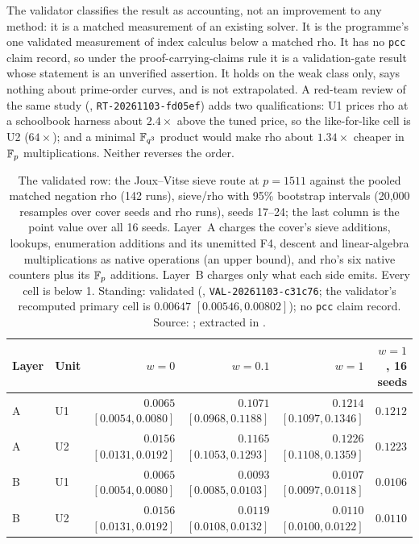 The validator classifies the result as accounting, not an improvement to
any method: it is a matched measurement of an existing solver. It is the
programme's one validated measurement of index calculus below a matched rho.
It has no \texttt{pcc} claim record, so under the proof-carrying-claims rule
it is a validation-gate result whose statement is an unverified assertion.
It holds on the weak class only, says nothing about prime-order curves, and
is not extrapolated. A red-team review of the same study
(,
\texttt{RT-20261103-fd05ef}) adds two qualifications: U1 prices rho at a
schoolbook harness about $2.4\times$ above the tuned price, so the
like-for-like cell is U2 ($64\times$); and a minimal $\mathbb{F}_{q^3}$ product would
make rho about $1.34\times$ cheaper in $\mathbb{F}_p$ multiplications. Neither
reverses the order.

\begin{table}[t]
\centering\small
\setlength{\tabcolsep}{4pt}
\begin{tabular}{@{}llrrrr@{}}
\toprule
Layer & Unit & $w=0$ & $w=0.1$ & $w=1$ & $w=1$, 16 seeds \\
\midrule
A & U1 & $0.0065$ $[0.0054,0.0080]$ & $0.1071$ $[0.0968,0.1188]$ & $0.1214$ $[0.1097,0.1346]$ & $0.1212$ \\
A & U2 & $0.0156$ $[0.0131,0.0192]$ & $0.1165$ $[0.1053,0.1293]$ & $0.1226$ $[0.1108,0.1359]$ & $0.1223$ \\
B & U1 & $0.0065$ $[0.0054,0.0080]$ & $0.0093$ $[0.0085,0.0103]$ & $0.0107$ $[0.0097,0.0118]$ & $0.0106$ \\
B & U2 & $0.0156$ $[0.0131,0.0192]$ & $0.0119$ $[0.0108,0.0132]$ & $0.0110$ $[0.0100,0.0122]$ & $0.0110$ \\
\bottomrule
\end{tabular}
\caption[]{The validated row: the Joux--Vitse sieve route at $p=1511$
against the pooled matched negation rho (142 runs), sieve/rho with 95\%
bootstrap intervals (20{,}000 resamples over cover seeds and rho runs),
seeds 17--24; the last column is the point value over all 16 seeds.
Layer~A charges the cover's sieve additions, lookups, enumeration
additions and its unemitted F4, descent and linear-algebra
multiplications as native operations (an upper bound), and rho's six
native counters plus its $\mathbb{F}_p$ additions. Layer~B charges only what each
side emits. Every cell is below 1. Standing: validated
(,
\texttt{VAL-20261103-c31c76}; the validator's recomputed primary cell is
$0.00647$ $[0.00546,0.00802]$); no \texttt{pcc} claim record. Source:
; extracted in
.}
\label{tab:pf-jv-sieve}
\end{table}

